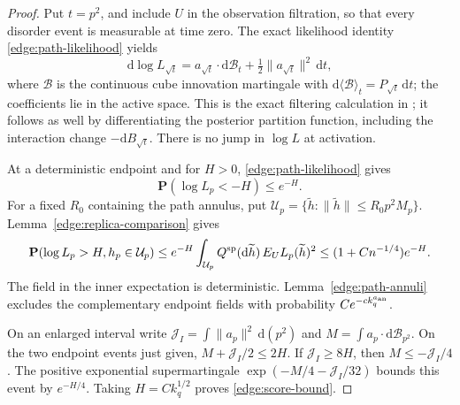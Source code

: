 \begin{proof}
Put \(t=p^2\), and include \(U\) in the observation filtration, so that
every disorder event is measurable at time zero.  The exact likelihood
identity \eqref{edge:path-likelihood} yields
\begin{equation}\label{edge:likelihood-sde}
 \mathrm d\log L_{\sqrt t}
       =a_{\sqrt t}\cdot\mathrm d\mathcal B_t
          +\tfrac12\|a_{\sqrt t}\|^2\,\mathrm dt,
\end{equation}
where \(\mathcal B\) is the continuous cube innovation martingale with
\(\mathrm d\langle\mathcal B\rangle_t=P_{\sqrt t}\,\mathrm dt\);
the coefficients lie in the active space.  This is the exact filtering
calculation in \cite[proof of Lemma~3.5, after Equation~(3.7)]{FUA};
it follows as well by differentiating the posterior partition function,
including the interaction change \(-\mathrm dB_{\sqrt t}\).  There is no jump
in \(\log L\) at activation.

At a deterministic endpoint and for \(H>0\),
\eqref{edge:path-likelihood} gives
\[
 \mathbf P(\log L_p<-H)\le e^{-H}.
\]
For a fixed \(R_0\) containing the path annulus, put
\(\mathcal U_p=\{\widetilde h:\|\widetilde h\|\le R_0p^2M_p\}\).
Lemma~\ref{edge:replica-comparison} gives
\[
 \mathbf P(\log L_p>H,h_p\in\mathcal U_p)
 \le e^{-H}\int_{\mathcal U_p}Q^{\rm sp}(\mathrm d\widetilde h)\,
          E_U L_p(\widetilde h)^2
 \le (1+Cn^{-1/4})e^{-H}.
\]
The field in the inner expectation is deterministic.
Lemma~\ref{edge:path-annuli} excludes the complementary endpoint fields
with probability \(Ce^{-c k_q^{a_{\rm an}}}\).

On an enlarged interval write
\(\mathcal J_I=\int\|a_p\|^2\,\mathrm d(p^2)\) and
\(M=\int a_p\cdot\mathrm d\mathcal B_{p^2}\).
On the two endpoint events just given,
\(M+\mathcal J_I/2\le2H\).  If \(\mathcal J_I\ge8H\), then
\(M\le-\mathcal J_I/4\).
The positive exponential supermartingale
\(\exp(-M/4-\mathcal J_I/32)\) bounds this event by \(e^{-H/4}\).
Taking \(H=Ck_q^{1/2}\) proves \eqref{edge:score-bound}.


\end{proof}
